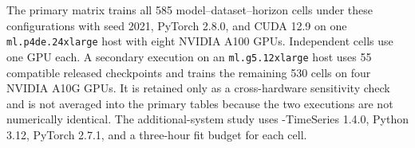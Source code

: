 The primary matrix trains all 585 model--dataset--horizon cells under these
configurations with seed 2021, PyTorch 2.8.0, and CUDA 12.9 on one
\texttt{ml.p4de.24xlarge} host with eight NVIDIA A100 GPUs. Independent cells
use one GPU each. A secondary execution on an
\texttt{ml.g5.12xlarge} host uses 55 compatible released checkpoints and
trains the remaining 530 cells on four NVIDIA A10G GPUs. It is retained only
as a cross-hardware sensitivity check and is not averaged into the primary
tables because the two executions are not numerically identical.
The additional-system study uses \autogluon{}-TimeSeries 1.4.0, Python 3.12,
PyTorch 2.7.1, and a three-hour fit budget for each \autogluon{} cell.
